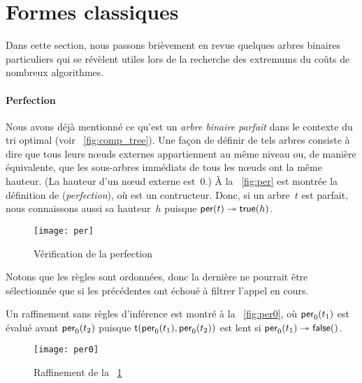 \section{Formes classiques}

Dans cette section, nous passons brièvement en revue quelques arbres
binaires particuliers qui se révèlent utiles lors de la recherche des
extremums du coûts de nombreux algorithmes.

\paragraph{Perfection}
\label{par:perfection}

 Nous avons déjà mentionné ce
qu'est un \emph{arbre binaire parfait} dans le contexte du tri optimal
(voir \fig~\vref{fig:comp_tree}). Une façon de définir de tels arbres
consiste à dire que tous leurs nœuds externes appartiennent au
même niveau ou, de manière équivalente, que les sous-arbres immédiats
de tous les nœuds ont la même hauteur. (La
hauteur d'un nœud externe est~\(0\).) À la \fig~\vref{fig:per} est
montrée la définition de 
(\emph{perfection}), où  est un contructeur. Donc, si un
arbre~\(t\) est parfait, nous connaissons aussi sa hauteur~\(h\)
puisque \(\textsf{per}(t) \twoheadrightarrow \textsf{true}(h)\).

\bigskip

\begin{figure}[h]
\centering
\texttt{[image: per]}
\caption{Vérification de la perfection}
\label{fig:per}
\end{figure}

\smallskip

\noindent Notons que les règles sont ordonnées, donc la dernière ne
pourrait être sélectionnée que si les précédentes ont échoué à filtrer
l'appel en cours.

Un raffinement sans règles d'inférence est montré à la
\fig~\vref{fig:per0}, où \(\textsf{per}_0(t_1)\) est évalué avant
\(\textsf{per}_0(t_2)\) puisque
\(\textsf{t}(\textsf{per}_0(t_1), \textsf{per}_0(t_2))\) est lent si
\(\textsf{per}_0(t_1) \twoheadrightarrow \textsf{false}()\).

\bigskip

\begin{figure}[h]
\centering
\texttt{[image: per0]}
\caption{Raffinement de la \fig~\ref{fig:per}}
\label{fig:per0}
\end{figure}


